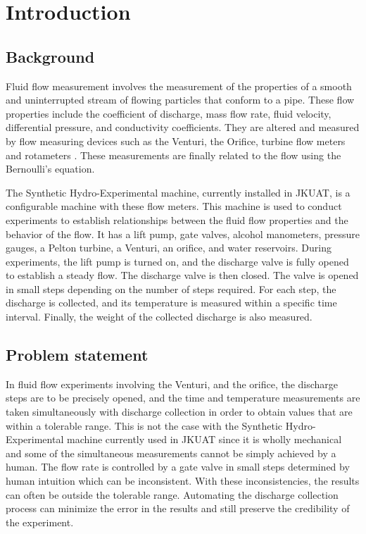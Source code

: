 \section{Introduction}
\label{sec:introduction}
\subsection{Background}
Fluid flow measurement involves the measurement of the properties of a smooth and uninterrupted stream of flowing particles that conform to a pipe. These flow properties include the coefficient of discharge, mass flow rate, fluid velocity, differential pressure, and conductivity coefficients. They are altered and measured by flow measuring devices such as the Venturi, the Orifice, turbine flow meters and rotameters \cite{nandagopal2022fluid}. These measurements are finally related to the flow using the Bernoulli's equation. 

\par
The Synthetic Hydro-Experimental machine, currently installed in JKUAT, is a configurable machine with these flow meters. This machine is used to conduct experiments to establish relationships between the fluid flow properties and the behavior of the flow. It has a lift pump, gate valves, alcohol manometers, pressure gauges, a Pelton turbine, a Venturi, an orifice, and water reservoirs.  During experiments, the lift pump is turned on, and the discharge valve is fully opened to establish a steady flow.  The discharge valve is then closed. The valve is opened in small steps depending on the number of steps required. For each step, the discharge is collected, and its temperature is measured within a specific time interval. Finally, the weight of the collected discharge is also measured.

\subsection{Problem statement}

In fluid flow experiments involving the Venturi, and the orifice, the discharge steps are to be precisely opened, and the time and temperature measurements are taken simultaneously with discharge collection in order to obtain values that are within a tolerable range. This is not the case with the Synthetic Hydro-Experimental machine currently used in JKUAT since it is wholly mechanical and some of the simultaneous measurements cannot be simply achieved by a human. The flow rate is controlled by a gate valve in small steps determined by human intuition which can be inconsistent. With these inconsistencies, the results can often be outside the tolerable range. Automating the discharge collection process can minimize the error in the results and still preserve the credibility of the experiment. 


